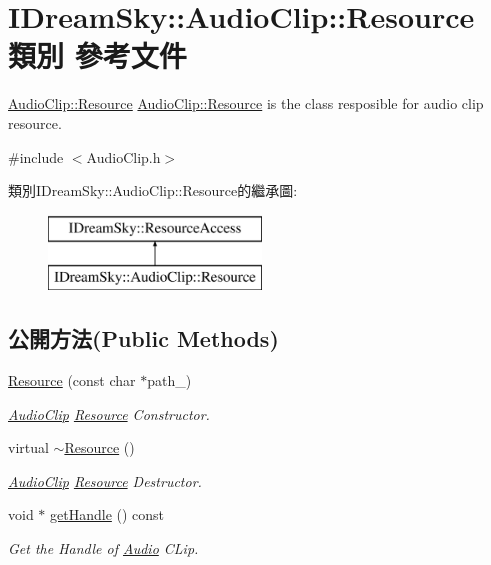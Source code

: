 \hypertarget{class_i_dream_sky_1_1_audio_clip_1_1_resource}{}\section{I\+Dream\+Sky\+:\+:Audio\+Clip\+:\+:Resource 類別 參考文件}
\label{class_i_dream_sky_1_1_audio_clip_1_1_resource}


\hyperlink{class_i_dream_sky_1_1_audio_clip_1_1_resource}{Audio\+Clip\+::\+Resource} \hyperlink{class_i_dream_sky_1_1_audio_clip_1_1_resource}{Audio\+Clip\+::\+Resource} is the class resposible for audio clip resource.  




{\ttfamily \#include $<$Audio\+Clip.\+h$>$}

類別\+I\+Dream\+Sky\+:\+:Audio\+Clip\+:\+:Resource的繼承圖\+:\begin{figure}[H]
\begin{center}
\leavevmode
\includegraphics[height=2.000000cm]{class_i_dream_sky_1_1_audio_clip_1_1_resource}
\end{center}
\end{figure}
\subsection*{公開方法(Public Methods)}
\begin{DoxyCompactItemize}
\item 
\hyperlink{class_i_dream_sky_1_1_audio_clip_1_1_resource_a4d0c425afd82c534fce82b2f4ec33073}{Resource} (const char $\ast$path\+\_\+)
\begin{DoxyCompactList}\small\item\em \hyperlink{class_i_dream_sky_1_1_audio_clip}{Audio\+Clip} \hyperlink{class_i_dream_sky_1_1_audio_clip_1_1_resource}{Resource} Constructor. \end{DoxyCompactList}\item 
virtual \hyperlink{class_i_dream_sky_1_1_audio_clip_1_1_resource_a31c5abfb8dc85cb158798e99d1400c7a}{$\sim$\+Resource} ()
\begin{DoxyCompactList}\small\item\em \hyperlink{class_i_dream_sky_1_1_audio_clip}{Audio\+Clip} \hyperlink{class_i_dream_sky_1_1_audio_clip_1_1_resource}{Resource} Destructor. \end{DoxyCompactList}\item 
void $\ast$ \hyperlink{class_i_dream_sky_1_1_audio_clip_1_1_resource_aa637ed65b9e1774ea970608b77bea0ad}{get\+Handle} () const 
\begin{DoxyCompactList}\small\item\em Get the Handle of \hyperlink{class_i_dream_sky_1_1_audio}{Audio} C\+Lip. \end{DoxyCompactList}\end{DoxyCompactItemize}
